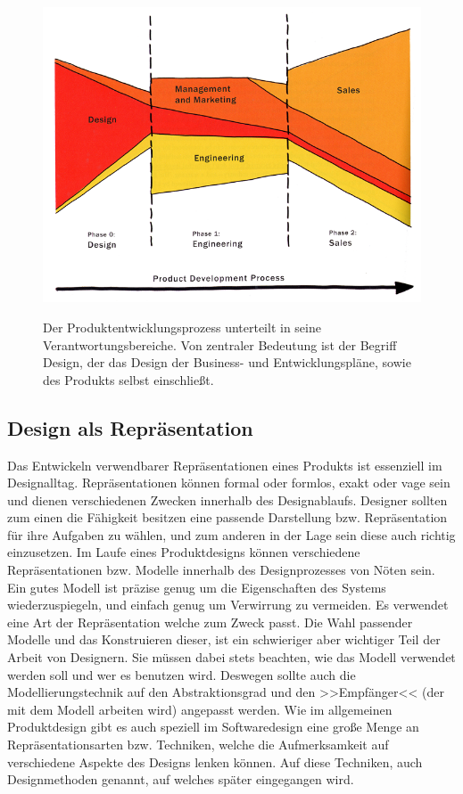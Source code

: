 \begin{figure}
        {\includegraphics[width=\linewidth]{gfx/buxtonProductDevProcess}}
		\caption[Der Produktentwicklungsprozess \newline \citep{Buxton:2007}]{Der Produktentwicklungsprozess unterteilt in seine Verantwortungsbereiche. Von zentraler Bedeutung ist der Begriff Design, der das Design der Business- und Entwicklungspläne, sowie des Produkts selbst einschließt.}\label{fig:buxtonProductDevProcess}
\end{figure}

\subsection{Design als Repräsentation}
Das Entwickeln verwendbarer Repräsentationen eines Produkts ist essenziell im Designalltag. Repräsentationen können formal oder formlos, exakt oder vage sein und dienen verschiedenen Zwecken innerhalb des Designablaufs. Designer sollten zum einen die Fähigkeit besitzen eine passende Darstellung bzw. Repräsentation für ihre Aufgaben zu wählen, und zum anderen in der Lage sein diese auch richtig einzusetzen.
Im Laufe eines Produktdesigns können verschiedene Repräsentationen bzw. Modelle innerhalb des Designprozesses von Nöten sein. Ein gutes Modell ist präzise genug um die Eigenschaften des Systems wiederzuspiegeln, und einfach genug um Verwirrung zu vermeiden. Es verwendet eine Art der Repräsentation welche zum Zweck passt.
Die Wahl passender Modelle und das Konstruieren dieser, ist ein schwieriger aber wichtiger Teil der Arbeit von Designern. Sie müssen dabei stets beachten, wie das Modell verwendet werden soll und wer es benutzen wird. Deswegen sollte auch die Modellierungstechnik auf den Abstraktionsgrad und den >>Empfänger<< (der mit dem Modell arbeiten wird) angepasst werden. \citep{Preece:1994}
Wie im allgemeinen Produktdesign gibt es auch speziell im Softwaredesign eine große Menge an Repräsentationsarten bzw. Techniken, welche die Aufmerksamkeit auf verschiedene Aspekte des Designs lenken können. Auf diese Techniken, auch Designmethoden genannt, auf welches später eingegangen wird.

